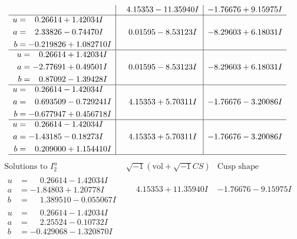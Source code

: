 \documentclass[1p]{elsarticle_modified}
\theoremstyle{definition}
\newcommand{\I}{\sqrt{-1}}
\begin{document}
$$\begin{array}{c|c|c}
 & \phantom{-}4.15353 - 11.35940 I & -1.76676 + 9.15975 I \\ \hline\begin{aligned}
u &= \phantom{-}0.26614 + 1.42034 I \\
a &= \phantom{-}2.33826 - 0.74470 I \\
b &= -0.219826 + 1.082710 I\end{aligned}
 & \phantom{-}0.01595 - 8.53123 I & -8.29603 + 6.18031 I \\ \hline\begin{aligned}
u &= \phantom{-}0.26614 + 1.42034 I \\
a &= -2.77691 + 0.49501 I \\
b &= \phantom{-}0.87092 - 1.39428 I\end{aligned}
 & \phantom{-}0.01595 - 8.53123 I & -8.29603 + 6.18031 I \\ \hline\begin{aligned}
u &= \phantom{-}0.26614 - 1.42034 I \\
a &= \phantom{-}0.693509 - 0.729241 I \\
b &= -0.677947 + 0.456718 I\end{aligned}
 & \phantom{-}4.15353 + 5.70311 I & -1.76676 - 3.20086 I \\ \hline\begin{aligned}
u &= \phantom{-}0.26614 - 1.42034 I \\
a &= -1.43185 - 0.18273 I \\
b &= \phantom{-}0.209000 + 1.154410 I\end{aligned}
 & \phantom{-}4.15353 + 5.70311 I & -1.76676 - 3.20086 I\\
 \hline 
 \end{array}$$\newpage$$\begin{array}{c|c|c}  
\text{Solutions to }I^u_{2}& \I (\text{vol} + \sqrt{-1}CS) & \text{Cusp shape}\\
 \hline 
\begin{aligned}
u &= \phantom{-}0.26614 - 1.42034 I \\
a &= -1.84803 + 1.20778 I \\
b &= \phantom{-}1.389510 - 0.055067 I\end{aligned}
 & \phantom{-}4.15353 + 11.35940 I & -1.76676 - 9.15975 I \\ \hline\begin{aligned}
u &= \phantom{-}0.26614 - 1.42034 I \\
a &= \phantom{-}2.25524 - 0.10732 I \\
b &= -0.429068 - 1.320870 I\end{aligned}

\end{array}$$
\end{document}
